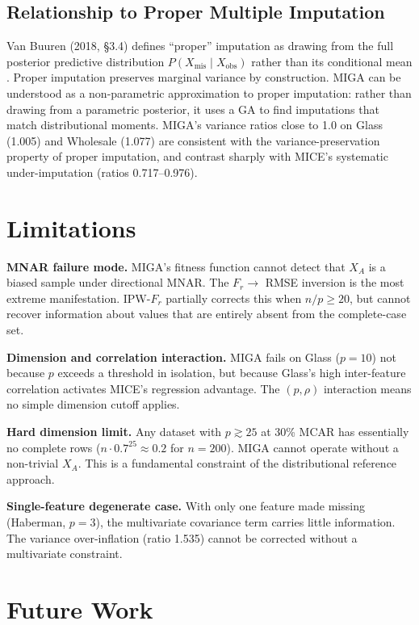 \subsection{Relationship to Proper Multiple Imputation}

Van Buuren (2018, \S3.4) defines ``proper'' imputation as drawing from the full posterior predictive distribution $P(X_{\text{mis}} \mid X_{\text{obs}})$ rather than its conditional mean \cite{vanBuuren2018}. Proper imputation preserves marginal variance by construction. MIGA can be understood as a non-parametric approximation to proper imputation: rather than drawing from a parametric posterior, it uses a GA to find imputations that match distributional moments. MIGA's variance ratios close to 1.0 on Glass (1.005) and Wholesale (1.077) are consistent with the variance-preservation property of proper imputation, and contrast sharply with MICE's systematic under-imputation (ratios 0.717--0.976).

\section{Limitations}

\textbf{MNAR failure mode.} MIGA's fitness function cannot detect that $X_A$ is a biased sample under directional MNAR. The $F_r \to$ RMSE inversion is the most extreme manifestation. IPW-$F_r$ partially corrects this when $n/p \geq 20$, but cannot recover information about values that are entirely absent from the complete-case set.

\textbf{Dimension and correlation interaction.} MIGA fails on Glass ($p=10$) not because $p$ exceeds a threshold in isolation, but because Glass's high inter-feature correlation activates MICE's regression advantage. The $(p, \rho)$ interaction means no simple dimension cutoff applies.

\textbf{Hard dimension limit.} Any dataset with $p \gtrsim 25$ at 30\% MCAR has essentially no complete rows ($n \cdot 0.7^{25} \approx 0.2$ for $n=200$). MIGA cannot operate without a non-trivial $X_A$. This is a fundamental constraint of the distributional reference approach.

\textbf{Single-feature degenerate case.} With only one feature made missing (Haberman, $p=3$), the multivariate covariance term carries little information. The variance over-inflation (ratio 1.535) cannot be corrected without a multivariate constraint.

\section{Future Work}

